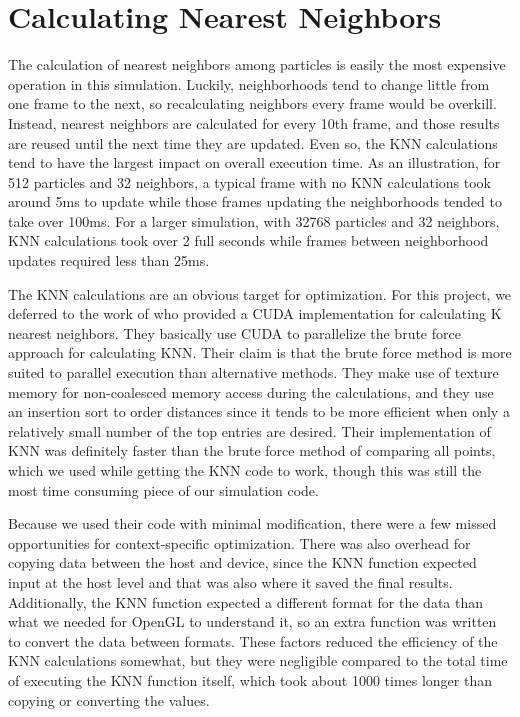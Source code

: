 \documentclass[cameraready]{acmsiggraph-awb}
\begin{document}
\section{Calculating Nearest Neighbors}

The calculation of nearest neighbors among particles is easily the most expensive operation in this simulation.  
Luckily, neighborhoods tend to change little from one frame to the next, so recalculating neighbors every frame would be overkill.
Instead, nearest neighbors are calculated for every 10th frame, and those results are reused until the next time they are updated.
Even so, the KNN calculations tend to have the largest impact on overall execution time.
As an illustration, for 512 particles and 32 neighbors, a typical frame with no KNN calculations took around 5ms to update while those frames updating the neighborhoods tended to take over 100ms.
For a larger simulation, with 32768 particles and 32 neighbors, KNN calculations took over 2 full seconds while frames between neighborhood updates required less than 25ms.

The KNN calculations are an obvious target for optimization.
For this project, we deferred to the work of \cite{Garcia_2008_CVGPU} who provided a CUDA implementation for calculating K nearest neighbors.
They basically use CUDA to parallelize the brute force approach for calculating KNN.  
Their claim is that the brute force method is more suited to parallel execution than alternative methods.
They make use of texture memory for non-coalesced memory access during the calculations, and they use an insertion sort to order distances since it tends to be more efficient when only a relatively small number of the top entries are desired.
Their implementation of KNN was definitely faster than the brute force method of comparing all points, which we used while getting the KNN code to work, though this was still the most time consuming piece of our simulation code.

Because we used their code with minimal modification, there were a few missed opportunities for context-specific optimization.  
There was also overhead for copying data between the host and device, since the KNN function expected input at the host level and that was also where it saved the final results.
Additionally, the KNN function expected a different format for the data than what we needed for OpenGL to understand it, so an extra function was written to convert the data between formats.
These factors reduced the efficiency of the KNN calculations somewhat, but they were negligible compared to the total time of executing the KNN function itself, which took about 1000 times longer than copying or converting the values.
\end{document}
